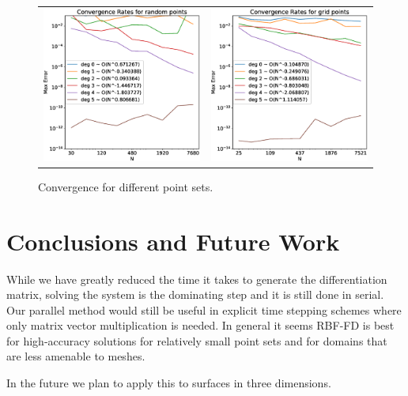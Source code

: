 \documentclass[12pt]{article}
\begin{document}
\begin{figure}
\begin{tabular}{cc}
			\includegraphics[width=.5\textwidth]{Convergence_random.eps} & \includegraphics[width=.5\textwidth]{Convergence_grid.eps} \\
		\end{tabular}
		\caption{Convergence for different point sets.}
		\label{convergence_points}
	\end{figure}

\section{Conclusions and Future Work}

	While we have greatly reduced the time it takes to generate the differentiation matrix, solving the system is the dominating step and it is still done in serial. Our parallel method would still be useful in explicit time stepping schemes where only matrix vector multiplication is needed. In general it seems RBF-FD is best for high-accuracy solutions for relatively small point sets and for domains that are less amenable to meshes. 
	
	In the future we plan to apply this to surfaces in three dimensions. 

 
\pagebreak
 
\printbibliography
\end{document}

